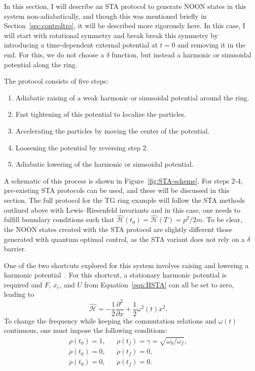 In this section, I will describe an STA protocol to generate NOON states in this system non-adiabatically, and though this was mentioned briefly in Section~\ref{sec:controltro}, it will be described more rigorously here.
In this case, I will start with rotational symmetry and break break this symmetry by introducing a time-dependent external potential at $t=0$ and removing it in the end.
For this, we do not choose a $\delta$ function, but instead a harmonic or sinusoidal potential along the ring.

The protocol consists of five steps:
\begin{enumerate}
\item Adiabatic raising of a weak harmonic or sinusoidal potential around the ring.
\item Fast tightening of this potential to localize the particles.
\item Accelerating the particles by moving the center of the potential.
\item Loosening the potential by reversing step 2.
\item Adiabatic lowering of the harmonic or sinusoidal potential.
\end{enumerate}
A schematic of this process is shown in Figure~\ref{fig:STA-scheme}.
For steps 2-4, pre-existing STA protocols can be used, and these will be discussed in this section.
The full protocol for the TG ring example will follow the STA methods outlined above with Lewis--Riesenfeld invariants and in this case, one needs to fulfill boundary conditions such that $\mathcal{\hat H}(t_0) = \mathcal{\hat H}(T)=p^2/2m$.
To be clear, the NOON states created with the STA protocol are slightly different those generated with quantum optimal control, as the STA variant does not rely on a $\delta$ barrier.

One of the two shortcuts explored for this system involves raising and lowering a harmonic potential~\cite{chen2010,chen20102}.
For this shortcut, a stationary harmonic potential is required and $F$, $x_c$, and $U$ from Equation~\eqref{eqn:HSTA} can all be set to zero, leading to
\begin{equation}
 \mathcal{\hat H}= -\frac{1}{2} \frac{\partial^2}{\partial x}+ \frac 1 2 \omega^2(t) x^2.
\end{equation}
\noindent To change the frequency while keeping the commutation relations and $\omega(t)$ continuous, one must impose the following conditions:
\begin{equation}
 \begin{array}{lcl}
\rho(t_0)=1, && \rho(t_f)=\gamma=\sqrt{\omega_0 / \omega_f},\\
\dot \rho(t_0)=0, && \dot \rho(t_f) =0, \\
\ddot \rho(t_0)=0, && \ddot \rho(t_f)=0.
\end{array} \label{eqn:squeeze}
\end{equation}

